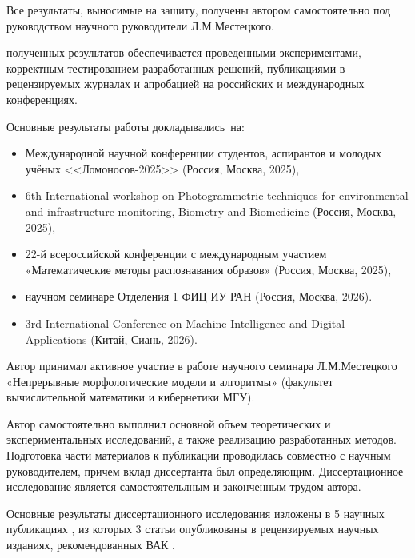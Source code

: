 Все результаты, выносимые на защиту, получены автором самостоятельно под руководством научного руководители Л.М.Местецкого.

{\reliability} полученных результатов обеспечивается проведенными экспериментами, корректным тестированием разработанных решений, публикациями в рецензируемых журналах и апробацией на российских и международных конференциях.

{\probation}
Основные результаты работы докладывались~на:
\begin{itemize}
    \item Международной научной конференции студентов, аспирантов и молодых учёных <<Ломоносов-2025>> (Россия, Москва, 2025),
    \item 6th International workshop on Photogrammetric techniques for environmental and infrastructure monitoring, Biometry and Biomedicine (Россия, Москва, 2025),
    \item 22-й всероссийской конференции с международным участием «Математические методы распознавания образов» (Россия, Москва, 2025),
    \item научном семинаре Отделения 1 ФИЦ ИУ РАН (Россия, Москва, 2026).
    \item 3rd International Conference on Machine Intelligence and Digital Applications (Китай, Сиань, 2026).
\end{itemize}

Автор принимал активное участие в работе научного семинара Л.М.Местецкого «Непрерывные морфологические модели и алгоритмы» (факультет вычислительной математики и кибернетики МГУ).

    {\contribution} Автор самостоятельно выполнил основной объем теоретических и экспериментальных исследований, а также реализацию разработанных методов. Подготовка части материалов к публикации проводилась совместно с научным руководителем, причем вклад диссертанта был определяющим. Диссертационное исследование является самостоятельлным и законченным трудом автора.

{\publications} Основные результаты диссертационного исследования изложены в 5 научных публикациях \cite{isprs-archives-XLVIII-2-W9-2025-283-2025, PRIA2026, mida2026, lomonosov25, mmpo25}, из которых 3 статьи опубликованы в рецензируемых научных изданиях, рекомендованных ВАК \cite{isprs-archives-XLVIII-2-W9-2025-283-2025, PRIA2026, mida2026}.

